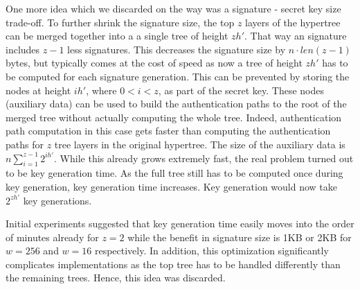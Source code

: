 One more idea which we discarded on the way was a 
signature - secret key size trade-off. 
To further shrink the \spx signature size, the top $z$ layers of the 
hypertree can be merged together into a a single tree of height $zh'$. That way 
an \spx signature includes $z-1$ less \wotsp signatures. This decreases the 
signature size by $n\cdot len(z-1)$ bytes, but typically comes at 
the cost of speed as now a tree of height $zh'$ has to be computed for 
each signature generation.
This can be prevented by storing the 
% 
nodes at height $ih'$, where $0 < i < z$, %
as part of the secret key. These nodes (auxiliary data) can
be used to build the authentication paths to the root of the merged tree without
actually computing the whole tree. Indeed, authentication path computation in 
this case gets faster than computing the authentication paths for $z$ tree layers 
in the original hypertree. 
The size of the auxiliary data 
is %
%
%
$n \sum_{i=1}^{z-1} 2^{ih'}$. %
While this already grows extremely fast, the real problem turned out to be 
key generation time. As the full tree still has to be 
computed once during key generation, key generation time increases. 
Key generation would now take 
$2^{zh'}$ \wotsp key generations. 

Initial experiments suggested that key generation time easily moves into 
the order of minutes already for $z=2$ while the benefit in signature size is 
1KB or 2KB for $w=256$ and $w=16$ respectively. In addition, this optimization 
significantly complicates implementations as the top tree has to be handled 
differently than the remaining trees. Hence, this idea was discarded. 
